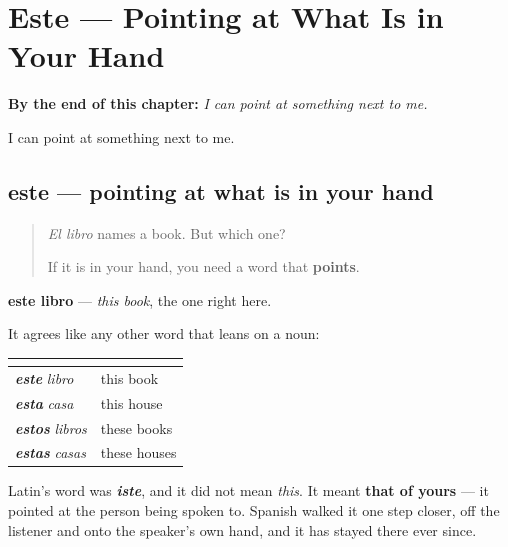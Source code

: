 
\chapter{Este --- Pointing at What Is in Your Hand}
\label{ch:este}

\begin{chapteropening}
\textbf{By the end of this chapter:} \emph{I can point at something next to me.}

I can point at something next to me.
\end{chapteropening}

\section[este]{este — pointing at what is in your hand}

\label{lesson:ES-C59-este}



\begin{quote}
\emph{El libro} names a book. But which one?

If it is in your hand, you need a word that \textbf{points}.
\end{quote}

\begin{cousinweb}
\textbf{este libro} — \emph{this book}, the one right here.

It agrees like any other word that leans on a noun:

\noindent
\begin{tabularx}{\linewidth}{@{}>{\raggedright\arraybackslash}X>{\raggedright\arraybackslash}X@{}}
\toprule
\textbf{} & \textbf{} \\
\midrule
\emph{\textbf{este}} \emph{libro} & this book \\
\emph{\textbf{esta}} \emph{casa} & this house \\
\emph{\textbf{estos}} \emph{libros} & these books \\
\emph{\textbf{estas}} \emph{casas} & these houses \\
\bottomrule
\end{tabularx}

Latin's word was \emph{\textbf{iste}}, and it did not mean \emph{this}. It meant \textbf{that of yours} — it pointed at the person being spoken to. Spanish walked it one step closer, off the listener and onto the speaker's own hand, and it has stayed there ever since.
\end{cousinweb}


